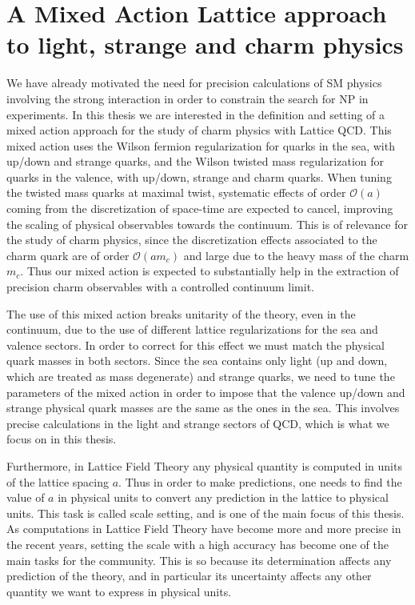 \section*{A Mixed Action Lattice approach to light, strange and charm physics}

We have already motivated the need for precision calculations of SM physics involving the strong interaction in order to constrain the search for NP in experiments. In this thesis we are interested in the definition and setting of a mixed action approach for the study of charm physics with Lattice QCD. This mixed action uses the Wilson fermion regularization for quarks in the sea, with up/down and strange quarks, and the Wilson twisted mass regularization for quarks in the valence, with up/down, strange and charm quarks. When tuning the twisted mass quarks at maximal twist, systematic effects of order $\mathcal{O}(a)$ coming from the discretization of space-time are expected to cancel, improving the scaling of physical observables towards the continuum. This is of relevance for the study of charm physics, since the discretization effects associated to the charm quark are of order $\mathcal{O}(am_c)$ and large due to the heavy mass of the charm $m_c$. Thus our mixed action is expected to substantially help in the extraction of precision charm observables with a controlled continuum limit.

The use of this mixed action breaks unitarity of the theory, even in the continuum, due to the use of different lattice regularizations for the sea and valence sectors. In order to correct for this effect we must match the physical quark masses in both sectors. Since the sea contains only light (up and down, which are treated as mass degenerate) and strange quarks, we need to tune the parameters of the mixed action in order to impose that the valence up/down and strange physical quark masses are the same as the ones in the sea. This involves precise calculations in the light and strange sectors of QCD, which is what we focus on in this thesis.

Furthermore, in Lattice Field Theory any physical quantity is computed in units of the lattice spacing $a$. Thus in order to make predictions, one needs to find the value of $a$ in physical units to convert any prediction in the lattice to physical units. This task is called scale setting, and is one of the main focus of this thesis. As computations in Lattice Field Theory have become more and more precise in the recent years, setting the scale with a high accuracy has become one of the main tasks for the community. This is so because its determination affects any prediction of the theory, and in particular its uncertainty affects any other quantity we want to express in physical units.

